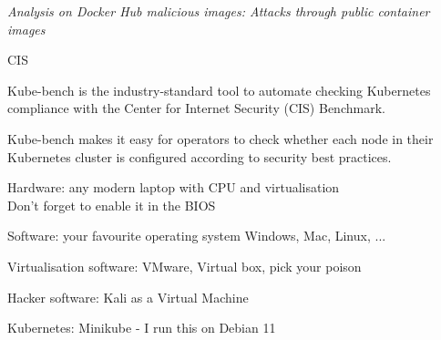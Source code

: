 \documentclass[Screen16to9,17pt]{foils}
\begin{document}




\emph{Analysis on Docker Hub malicious images: Attacks through public container images}







CIS

Kube-bench is the industry-standard tool to automate checking Kubernetes compliance with the Center for Internet Security (CIS) Benchmark.

Kube-bench makes it easy for operators to check whether each node in their Kubernetes cluster is configured according to security best practices.




\begin{list2}
\item Hardware: any modern laptop with CPU and virtualisation\\
Don't forget to enable it in the BIOS
\item Software: your favourite operating system Windows, Mac, Linux, ...
\item Virtualisation software: VMware, Virtual box, pick your poison
\item Hacker software: Kali as a Virtual Machine 
\item Kubernetes: Minikube -  I run this on Debian 11
\end{list2}




~
\begin{list2}
\item
\end{list2}

\myquestionspage
\end{document}
